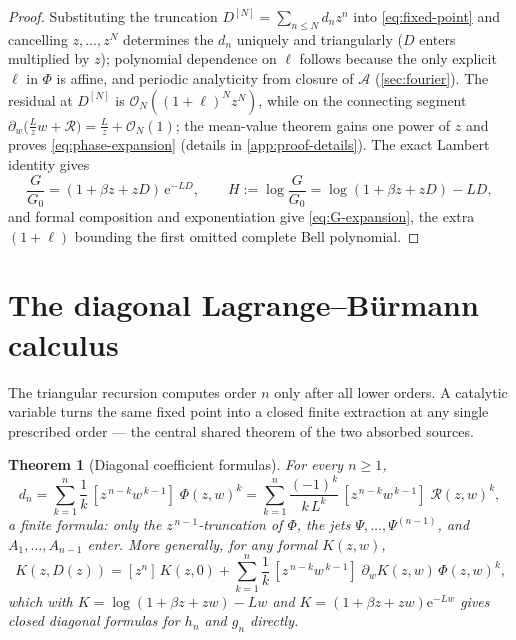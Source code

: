 \documentclass[11pt,oneside]{article}
\numberwithin{equation}{section}
\newtheorem{theorem}{Theorem}[section]
\theoremstyle{definition}
\theoremstyle{remark}
\newcommand{\e}{\mathrm e}
\newcommand{\bigO}{\mathcal O}
\newcommand{\Gzero}{G_0}
\begin{document}
\begin{proof}
Substituting the truncation $D^{[N]}=\sum_{n\le N}d_nz^{n}$ into
\eqref{eq:fixed-point} and cancelling $z,\dots,z^{N}$ determines the
$d_n$ uniquely and triangularly ($D$ enters multiplied by $z$);
polynomial dependence on $\ell$ follows because the only explicit
$\ell$ in $\Phi$ is affine, and periodic analyticity from closure of
$\mathscr A$ (\cref{sec:fourier}).  The residual at $D^{[N]}$ is
$\bigO_N((1+\ell)^{N}z^{N})$, while on the connecting segment
$\partial_w\bigl(\tfrac Lzw+\mathcal R\bigr)=\tfrac Lz+\bigO_N(1)$;
the mean-value theorem gains one power of $z$ and proves
\eqref{eq:phase-expansion} (details in
\cref{app:proof-details}).  The exact Lambert identity gives
\begin{equation}
 \frac{G}{\Gzero}=(1+\beta z+zD)\,\e^{-LD},
 \qquad
 H:=\log\frac{G}{\Gzero}=\log(1+\beta z+zD)-LD,
 \label{eq:ratio-exact}
\end{equation}
and formal composition and exponentiation give
\eqref{eq:G-expansion}, the extra $(1+\ell)$ bounding the first
omitted complete Bell polynomial.
\end{proof}

\section{The diagonal Lagrange--B\"urmann calculus}
\label{sec:diagonal}

The triangular recursion computes order $n$ only after all lower
orders.  A catalytic variable turns the same fixed point into a
closed finite extraction at any single prescribed order --- the
central shared theorem of the two absorbed sources.

\begin{theorem}[Diagonal coefficient formulas]
\label{thm:diagonal}
For every $n\ge1$,
\begin{equation}
 \boxed{\;
 d_n=\sum_{k=1}^{n}\frac1k\,
 [z^{\,n-k}w^{\,k-1}]\;\Phi(z,w)^{k}
 =\sum_{k=1}^{n}\frac{(-1)^{k}}{k\,L^{k}}\,
 [z^{\,n-k}w^{\,k-1}]\;\mathcal R(z,w)^{k},
 \;}
 \label{eq:diagonal-dn}
\end{equation}
a finite formula: only the $z^{\,n-1}$-truncation of $\Phi$, the jets
$\Psi,\dots,\Psi^{(n-1)}$, and $A_1,\dots,A_{n-1}$ enter.  More
generally, for any formal $K(z,w)$,
\begin{equation}
 [z^{n}]\,K(z,D(z))
 =[z^{n}]\,K(z,0)
 +\sum_{k=1}^{n}\frac1k\,
 [z^{\,n-k}w^{\,k-1}]\;
 \partial_wK(z,w)\,\Phi(z,w)^{k},
 \label{eq:diagonal-composition}
\end{equation}
which with $K=\log(1+\beta z+zw)-Lw$ and
$K=(1+\beta z+zw)\e^{-Lw}$ gives closed diagonal formulas for
$h_n$ and $g_n$ directly.
\end{theorem}
\end{document}
